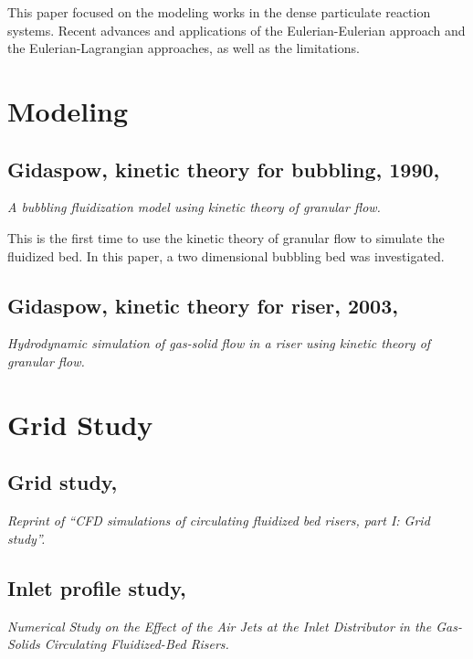 \documentclass[12pt]{report}
\begin{document}
This paper focused on the modeling works in the dense particulate reaction systems. 
Recent advances and applications of the Eulerian-Eulerian approach and the Eulerian-Lagrangian approaches, as well as the limitations.

\section{Modeling}
%
%
\subsection[Gidaspow, kinetic theory for bubbling, 1990]{Gidaspow, kinetic theory for bubbling, 1990, \cite{Ding1990}}
\textit{A bubbling fluidization model using kinetic theory of granular flow.}

This is the first time to use the kinetic theory of granular flow to simulate the fluidized bed. 
In this paper, a two dimensional bubbling bed was investigated. 

%
%
\subsection[Gidaspow, kinetic theory for riser, 2003]{Gidaspow, kinetic theory for riser, 2003, \cite{Huilin2003}}
\textit{Hydrodynamic simulation of gas-solid flow in a riser using kinetic theory of granular flow.}

\section{Grid Study}
%
%
\subsection[Grid study, 2014]{Grid study, \cite{Li2014}}
\textit{Reprint of ``CFD simulations of circulating fluidized bed risers, part I: Grid study''.}

%
%
\subsection[Inlet profile study, 2010]{Inlet profile study, \cite{Peng2010}}
\textit{Numerical Study on the Effect of the Air Jets at the Inlet Distributor in the Gas-Solids Circulating Fluidized-Bed Risers.}
\end{document}
